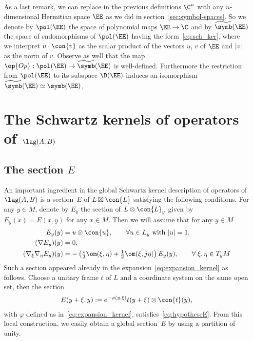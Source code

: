 As a last remark, we can replace in the previous definitions $\C^n$ with any $n$-dimensional Hermitian space $\EE$ as we did in section~\ref{sec:symbol-spaces}. So we denote by $\pol (\EE)$ the space of polynomial maps $\EE \rightarrow \C$ and by $\widetilde{\symb} (\EE)$ the space of endomorphisms of $\pol (\EE)$ having the form~\eqref{eq:sch_ker}, where we interpret $u \cdot \con{v}$ as the scalar product of the vectors $u$, $v$ of $\EE$ and $|v|$ as the norm of $v$. Observe as well that the map $\op{Op} : \pol (\EE) \rightarrow
\widetilde{\symb} (\EE)$ is well-defined. Furthermore the restriction from $\pol (\EE)$ to its subspace $\D (\EE)$ induces an isomorphism $\widetilde{\symb} (\EE) \simeq \symb (\EE)$.


\section{The Schwartz kernels of operators of \texorpdfstring{$\lag (A, B)$}{L(A,B)} } \label{sec:schw-kern-oper}



\subsection{The section \texorpdfstring{$E$}{E}} \label{sec:section-ee}

An important ingredient in the global Schwartz kernel description of operators of $\lag (A,B)$ is a section~$E$ of $L \boxtimes \con{L}$ satisfying the following conditions. For any $y\in M$, denote by $E_y $ the section of $L \otimes \con{L}_y$ given by $E_y(x) = E(x,y)$ for any $x \in M$. Then we will assume that for any $y\in M$
\begin{equation}\label{eq:hypotheseE}
\begin{split}
 E_y(y) &= u \otimes \con{u},   \qquad\forall u \in L_y \text{ with } |u| =1, \\
 (\nabla E_y)(y) &=0,  \\
 (\nabla_{\xi} \nabla_{\eta} E_y)(y) &= - \left(\tfrac{i}{2} \om (\xi, \eta) + \tfrac{1}{2}
\om (\xi, j \eta) \right) E_y (y),  \qquad\forall \; \xi, \eta \in T_yM
\end{split}
\end{equation}
Such a section appeared already in the expansion~\eqref{eq:expansion_kernel} as follows. Choose a unitary frame $t$ of $L$ and a coordinate system on the same open set, then the section
\begin{gather}\label{eq:exempleE}
E (y+ \xi, y) := e^{-\varphi (y, \xi)} t(y+ \xi) \otimes \con{t}(y),
\end{gather}
with $\varphi$ defined as in~\eqref{eq:expansion_kernel}, satisfies~\eqref{eq:hypotheseE}. From this local construction, we easily obtain a global section~$E$ by using a partition of unity.


